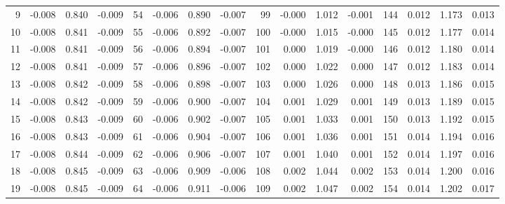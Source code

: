 \begin{table}
{\begin{tabular}{rrrr|rrrr|rrrr|crrr}
  9 & \tiny{ -0.008} &   0.840 & \tiny{ -0.009} &  54 & \tiny{ -0.006} &   0.890 & \tiny{ -0.007} &  99 & \tiny{ -0.000} &   1.012 & \tiny{ -0.001} & 144 & \tiny{  0.012} &   1.173 & \tiny{  0.013}\\
 10 & \tiny{ -0.008} &   0.841 & \tiny{ -0.009} &  55 & \tiny{ -0.006} &   0.892 & \tiny{ -0.007} & 100 & \tiny{ -0.000} &   1.015 & \tiny{ -0.000} & 145 & \tiny{  0.012} &   1.177 & \tiny{  0.014}\\
 11 & \tiny{ -0.008} &   0.841 & \tiny{ -0.009} &  56 & \tiny{ -0.006} &   0.894 & \tiny{ -0.007} & 101 & \tiny{  0.000} &   1.019 & \tiny{ -0.000} & 146 & \tiny{  0.012} &   1.180 & \tiny{  0.014}\\
 12 & \tiny{ -0.008} &   0.841 & \tiny{ -0.009} &  57 & \tiny{ -0.006} &   0.896 & \tiny{ -0.007} & 102 & \tiny{  0.000} &   1.022 & \tiny{  0.000} & 147 & \tiny{  0.012} &   1.183 & \tiny{  0.014}\\
 13 & \tiny{ -0.008} &   0.842 & \tiny{ -0.009} &  58 & \tiny{ -0.006} &   0.898 & \tiny{ -0.007} & 103 & \tiny{  0.000} &   1.026 & \tiny{  0.000} & 148 & \tiny{  0.013} &   1.186 & \tiny{  0.015}\\
 14 & \tiny{ -0.008} &   0.842 & \tiny{ -0.009} &  59 & \tiny{ -0.006} &   0.900 & \tiny{ -0.007} & 104 & \tiny{  0.001} &   1.029 & \tiny{  0.001} & 149 & \tiny{  0.013} &   1.189 & \tiny{  0.015}\\
 15 & \tiny{ -0.008} &   0.843 & \tiny{ -0.009} &  60 & \tiny{ -0.006} &   0.902 & \tiny{ -0.007} & 105 & \tiny{  0.001} &   1.033 & \tiny{  0.001} & 150 & \tiny{  0.013} &   1.192 & \tiny{  0.015}\\
 16 & \tiny{ -0.008} &   0.843 & \tiny{ -0.009} &  61 & \tiny{ -0.006} &   0.904 & \tiny{ -0.007} & 106 & \tiny{  0.001} &   1.036 & \tiny{  0.001} & 151 & \tiny{  0.014} &   1.194 & \tiny{  0.016}\\
 17 & \tiny{ -0.008} &   0.844 & \tiny{ -0.009} &  62 & \tiny{ -0.006} &   0.906 & \tiny{ -0.007} & 107 & \tiny{  0.001} &   1.040 & \tiny{  0.001} & 152 & \tiny{  0.014} &   1.197 & \tiny{  0.016}\\
 18 & \tiny{ -0.008} &   0.845 & \tiny{ -0.009} &  63 & \tiny{ -0.006} &   0.909 & \tiny{ -0.006} & 108 & \tiny{  0.002} &   1.044 & \tiny{  0.002} & 153 & \tiny{  0.014} &   1.200 & \tiny{  0.016}\\
 19 & \tiny{ -0.008} &   0.845 & \tiny{ -0.009} &  64 & \tiny{ -0.006} &   0.911 & \tiny{ -0.006} & 109 & \tiny{  0.002} &   1.047 & \tiny{  0.002} & 154 & \tiny{  0.014} &   1.202 & \tiny{  0.017}\\

\end{tabular}}
\end{table}
